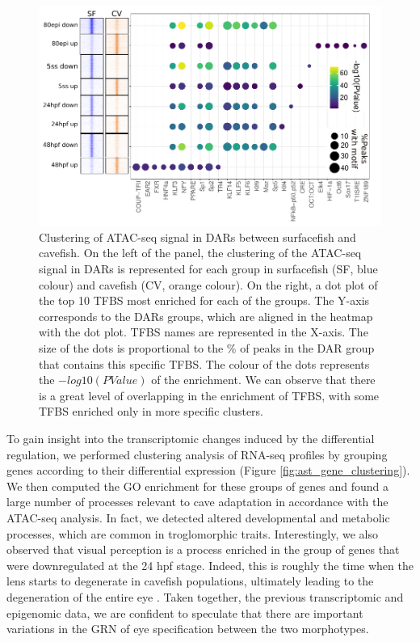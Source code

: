 \begin{figure}
\centering
\includegraphics[width=1\textwidth]{Figures/astyanax/DAR_clustering}
\caption[Clustering of DARs between surfacefish and cavefish]{Clustering of ATAC-seq signal in DARs between surfacefish and cavefish. On the left of the panel, the clustering of the ATAC-seq signal in DARs is represented for each group in surfacefish (SF, blue colour) and cavefish (CV, orange colour). On the right, a dot plot of the top 10 TFBS most enriched for each of the groups. The Y-axis corresponds to the DARs groups, which are aligned in the heatmap with the dot plot. TFBS names are represented in the X-axis. The size of the dots is proportional to the \% of peaks in the DAR group that contains this specific TFBS. The colour of the dots represents the $-log10(PValue)$ of the enrichment. We can observe that there is a great level of overlapping in the enrichment of TFBS, with some TFBS enriched only in more specific clusters.}
\label{fig:ast_dar_clustering}
\end{figure}


To gain insight into the transcriptomic changes induced by the differential regulation, we performed clustering analysis of RNA-seq profiles by grouping genes according to their differential expression (Figure \ref{fig:ast_gene_clustering}). We then computed the GO enrichment for these groups of genes and found a large number of processes relevant to cave adaptation in accordance with the ATAC-seq analysis. In fact, we detected altered developmental and metabolic processes, which are common in troglomorphic traits. Interestingly, we also observed that visual perception is a process enriched in the group of genes that were downregulated at the 24 hpf stage. Indeed, this is roughly the time when the lens starts to degenerate in cavefish populations, ultimately leading to the degeneration of the entire eye \parencite{jeffery_regressive_2009, ma_hypomorphic_2020, strickler_lens_2007}. Taken together, the previous transcriptomic and epigenomic data, we are confident to speculate that there are important variations in the GRN of eye specification between the two morphotypes.


